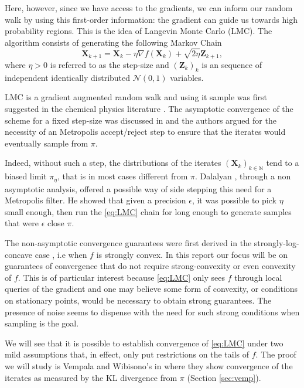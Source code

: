 \documentclass[10pt,journal,a4paper]{IEEEtran}
\theoremstyle{definition}
\newcommand{\bX}{\mathbf{X}}
\begin{document}
Here, however, since we have access to the gradients, we can inform our random walk by using this first-order information: the gradient can guide us towards high probability regions. This is the idea of Langevin Monte Carlo (LMC). The algorithm consists of generating the following Markov Chain 
\begin{equation}
\bX_{k+1} = \bX_k - \eta \nabla f(\bX_k) + \sqrt{2\eta}\mathbf{Z}_{k+1},
\label{eq:LMC}
\tag{LMC}
\end{equation}
where $\eta > 0$ is referred to as the step-size and $(\mathbf{Z}_k)_k$ is an sequence of independent identically distributed $\mathcal{N}(0, 1)$ variables.

LMC is a gradient augmented random walk and using it sample was first suggested in the chemical physics literature \cite{rossky_brownian_1978}. The asymptotic convergence of the scheme for a fixed step-size was discussed in \cite{roberts_exponential_1996} and the authors argued for the necessity of an Metropolis accept/reject step to ensure that the iterates would eventually sample from $\pi$.

Indeed, without such a step, the distributions of the iterates $(\bX_k)_{k\in \mathbb{N}}$ tend to a biased limit $\pi_\eta$, that is in most cases different from $\pi$. Dalalyan \cite{dalalyan_theoretical_2016}, through a non asymptotic analysis, offered a possible way of side stepping this need for a Metropolis filter. He showed that given a precision $\epsilon$, it was possible to pick $\eta$ small enough, then run the \eqref{eq:LMC} chain for long enough to generate samples that were $\epsilon$ close $\pi$.

The non-asymptotic convergence guarantees were first derived in the strongly-log-concave case \cite{dalalyan_theoretical_2016}, i.e when $f$ is strongly convex. In this report our focus will be on guarantees of convergence that do not require strong-convexity or even convexity of $f$. This is of particular interest because \eqref{eq:LMC} only sees $f$ through local queries of the gradient and one may believe some form of convexity, or conditions on stationary points, would be necessary to obtain strong guarantees. The presence of noise seems to dispense with the need for such strong conditions when sampling is the goal.

We will see that it is possible to establish convergence of \eqref{eq:LMC} under two mild assumptions that, in effect, only put restrictions on the tails of $f$. The proof we will study is Vempala and Wibisono's in \cite{vempala_rapid_2019} where they show convergence of the iterates as measured by the KL divergence from $\pi$ (Section \ref{sec:vemp}).
\end{document}
